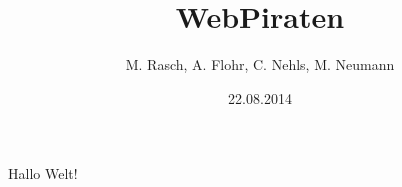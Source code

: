 \documentclass{beamer}
\begin{document}
\title{WebPiraten}  
\author{M. Rasch, A. Flohr, C. Nehls, M. Neumann}
\date{22.08.2014} 

\begin{frame}
\maketitle
\end{frame} 

\begin{frame}
Hallo Welt!
\end{frame}
\end{document}
